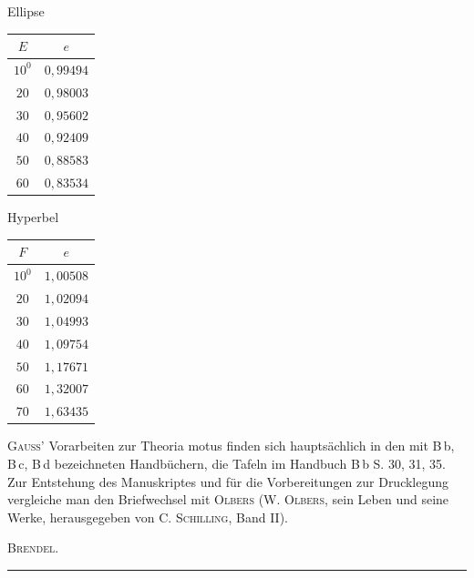 \begin{center}
\begin{minipage}[t]{.42\linewidth}\centering
Ellipse\par\smallskip
\begin{tabular}{c|c}
$E$ & $e$ \\
\hline
$10^0$ & $0{,}99494$ \\
$20$ & $0{,}98003$ \\
$30$ & $0{,}95602$ \\
$40$ & $0{,}92409$ \\
$50$ & $0{,}88583$ \\
$60$ & $0{,}83534$ \\
\end{tabular}
\end{minipage}\hfill
\begin{minipage}[t]{.42\linewidth}\centering
Hyperbel\par\smallskip
\begin{tabular}{c|c}
$F$ & $e$ \\
\hline
$10^0$ & $1{,}00508$ \\
$20$ & $1{,}02094$ \\
$30$ & $1{,}04993$ \\
$40$ & $1{,}09754$ \\
$50$ & $1{,}17671$ \\
$60$ & $1{,}32007$ \\
$70$ & $1{,}63435$ \\
\end{tabular}
\end{minipage}
\end{center}
\textsc{Gauss}’ Vorarbeiten zur Theoria motus finden sich hauptsächlich in den mit B\,b, B\,c, B\,d bezeichneten Handbüchern, die Tafeln im Handbuch B\,b S. 30, 31, 35. Zur Entstehung des Manuskriptes und für die Vorbereitungen zur Drucklegung vergleiche man den Briefwechsel mit \textsc{Olbers} (W. \textsc{Olbers}, sein Leben und seine Werke, herausgegeben von C. \textsc{Schilling}, Band II).

\begin{flushright}
\textsc{Brendel}.
\end{flushright}

\begin{center}
\rule{0.3\linewidth}{0.4pt}
\end{center}
